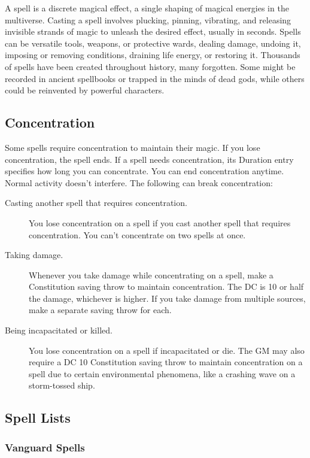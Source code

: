 A spell is a discrete magical effect, a single shaping of magical
energies in the multiverse. Casting a spell involves plucking, pinning,
vibrating, and releasing invisible strands of magic to unleash the
desired effect, usually in seconds. Spells can be versatile tools,
weapons, or protective wards, dealing damage, undoing it, imposing or
removing conditions, draining life energy, or restoring it. Thousands of
spells have been created throughout history, many forgotten. Some might
be recorded in ancient spellbooks or trapped in the minds of dead gods,
while others could be reinvented by powerful characters.

\subsection{Concentration}\label{_concentration}

Some spells require concentration to maintain their magic. If you lose
concentration, the spell ends. If a spell needs concentration, its
Duration entry specifies how long you can concentrate. You can end
concentration anytime. Normal activity doesn't interfere. The following
can break concentration:

\begin{description}
\item[Casting another spell that requires concentration.]
You lose concentration on a spell if you cast another spell that
requires concentration. You can't concentrate on two spells at once.
\item[Taking damage.]
Whenever you take damage while concentrating on a spell, make a
Constitution saving throw to maintain concentration. The DC is 10 or
half the damage, whichever is higher. If you take damage from multiple
sources, make a separate saving throw for each.
\item[Being incapacitated or killed.]
You lose concentration on a spell if incapacitated or die. The GM may
also require a DC 10 Constitution saving throw to maintain concentration
on a spell due to certain environmental phenomena, like a crashing wave
on a storm-tossed ship.
\end{description}

\subsection{Spell Lists}\label{_spell_lists}

\subsubsection{Vanguard Spells}\label{_vanguard_spells}

